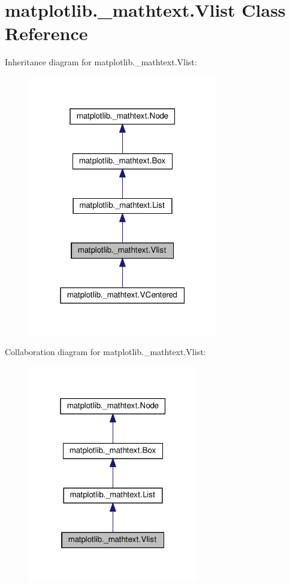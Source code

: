 \hypertarget{classmatplotlib_1_1__mathtext_1_1Vlist}{}\section{matplotlib.\+\_\+mathtext.\+Vlist Class Reference}
\label{classmatplotlib_1_1__mathtext_1_1Vlist}


Inheritance diagram for matplotlib.\+\_\+mathtext.\+Vlist\+:
\nopagebreak
\begin{figure}[H]
\begin{center}
\leavevmode
\includegraphics[width=235pt]{classmatplotlib_1_1__mathtext_1_1Vlist__inherit__graph}
\end{center}
\end{figure}


Collaboration diagram for matplotlib.\+\_\+mathtext.\+Vlist\+:
\nopagebreak
\begin{figure}[H]
\begin{center}
\leavevmode
\includegraphics[width=211pt]{classmatplotlib_1_1__mathtext_1_1Vlist__coll__graph}
\end{center}
\end{figure}
